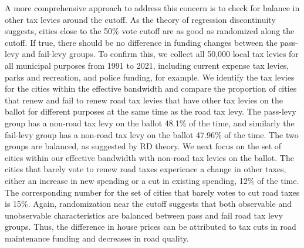 A more comprehensive approach to address this concern is to check for balance in other tax levies around the cutoff. As the theory of regression discontinuity suggests, cities close to the 50\% vote cutoff are as good as randomized along the cutoff.  If true, there should be no difference in funding changes between the pass-levy and fail-levy groups. To confirm this, we collect all 50,000 local tax levies for all municipal purposes from 1991 to 2021, including current expense tax levies, parks and recreation, and police funding, for example. We identify the tax levies for the cities within the effective bandwidth and compare the proportion of cities that renew and fail to renew road tax levies that have other tax levies on the ballot for different purposes at the same time as the road tax levy. The pass-levy group has a non-road tax levy on the ballot 48.1\% of the time, and similarly the fail-levy group has a non-road tax levy on the ballot 47.96\% of the time. The two groups are balanced, as suggested by RD theory. We next focus on the set of cities within our effective bandwidth with non-road tax levies on the ballot. The cities that barely vote to renew road taxes experience a change in other taxes, either an increase in new spending or a cut in existing spending, 12\% of the time. The corresponding number for the set of cities that barely votes to cut road taxes is 15\%. Again, randomization near the cutoff suggests that both observable and unobservable  characteristics are balanced between pass and fail road tax levy groups. Thus, the difference in house prices can be attributed to tax cuts in road maintenance funding and decreases in road quality.


